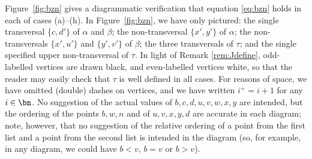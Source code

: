 Figure~\ref{fig:bzn} gives a diagrammatic verification that equation \eqref{eq:bzn} holds in each of cases (a)--(h).  In Figure~\ref{fig:bzn}, we have only pictured: the single transversal $\{c,d'\}$ of $\alpha$ and $\beta$; the non-transversal $\{x',y'\}$ of $\alpha$; the non-transversals $\{x',u'\}$ and $\{y',v'\}$ of $\beta$; the three transversals of $\tau$; and the single specified upper non-transversal of $\tau$.  In light of Remark \ref{rem:Jdefine}, odd-labelled vertices are drawn black, and even-labelled vertices white, so that the reader may easily check that $\tau$ is well defined in all cases.  For reasons of space, we have omitted (double) dashes on vertices, and we have written $i^+=i+1$ for any~$i\in\bn$.  No suggestion of the actual values of $b,c,d,u,v,w,x,y$ are intended, but the ordering of the points $b,w,n$ and of $u,v,x,y,d$ are accurate in each diagram; note, however, that no suggestion of the relative ordering of a point from the first list and a point from the second list is intended in the diagram (so, for example, in any diagram, we could have $b<v$, $b=v$ or $b>v$).


